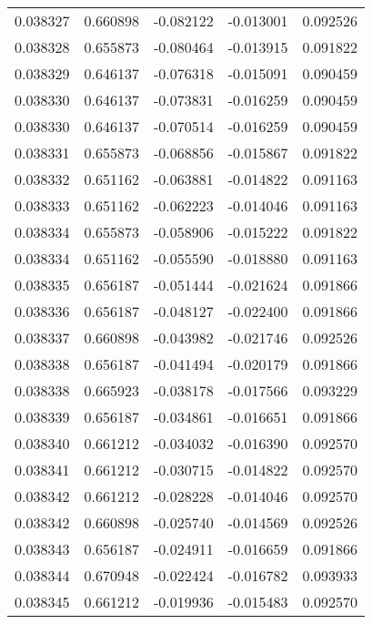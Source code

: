 \begin{tabular}{lrrrr}
0.038327    &  0.660898 & -0.082122 & -0.013001 &             0.092526 \\
0.038328    &  0.655873 & -0.080464 & -0.013915 &             0.091822 \\
0.038329    &  0.646137 & -0.076318 & -0.015091 &             0.090459 \\
0.038330    &  0.646137 & -0.073831 & -0.016259 &             0.090459 \\
0.038330    &  0.646137 & -0.070514 & -0.016259 &             0.090459 \\
0.038331    &  0.655873 & -0.068856 & -0.015867 &             0.091822 \\
0.038332    &  0.651162 & -0.063881 & -0.014822 &             0.091163 \\
0.038333    &  0.651162 & -0.062223 & -0.014046 &             0.091163 \\
0.038334    &  0.655873 & -0.058906 & -0.015222 &             0.091822 \\
0.038334    &  0.651162 & -0.055590 & -0.018880 &             0.091163 \\
0.038335    &  0.656187 & -0.051444 & -0.021624 &             0.091866 \\
0.038336    &  0.656187 & -0.048127 & -0.022400 &             0.091866 \\
0.038337    &  0.660898 & -0.043982 & -0.021746 &             0.092526 \\
0.038338    &  0.656187 & -0.041494 & -0.020179 &             0.091866 \\
0.038338    &  0.665923 & -0.038178 & -0.017566 &             0.093229 \\
0.038339    &  0.656187 & -0.034861 & -0.016651 &             0.091866 \\
0.038340    &  0.661212 & -0.034032 & -0.016390 &             0.092570 \\
0.038341    &  0.661212 & -0.030715 & -0.014822 &             0.092570 \\
0.038342    &  0.661212 & -0.028228 & -0.014046 &             0.092570 \\
0.038342    &  0.660898 & -0.025740 & -0.014569 &             0.092526 \\
0.038343    &  0.656187 & -0.024911 & -0.016659 &             0.091866 \\
0.038344    &  0.670948 & -0.022424 & -0.016782 &             0.093933 \\
0.038345    &  0.661212 & -0.019936 & -0.015483 &             0.092570 \\

\end{tabular}
